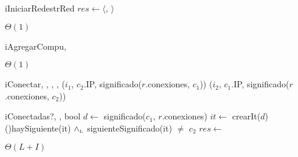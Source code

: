 \begin{Algoritmos}

  \nuevoAlgo
  \begin{algoritmo}{iIniciarRed}{}{estrRed}
    $res \gets \langle$\vacio{}, \vacio{}$\rangle$ 
  \end{algoritmo}
  \datosAlgoritmo{} %
  {} %
  {} %
  {$\Theta(1)$} %
  {} %

  \nuevoAlgo
  \begin{algoritmo}{iAgregarCompu}{, }{}
     
     
  \end{algoritmo}
  \datosAlgoritmo{} %
  {} %
  {} %
  {$\Theta(1)$} %
  {} %

  
  
  \nuevoAlgo
  \begin{algoritmo}{iConectar}{, , , , }{}
    ($i_{1}$, $c_{2}$.IP, significado($r$.conexiones, $c_{1}$))
    ($i_{2}$, $c_{1}$.IP, significado($r$.conexiones, $c_{2}$))
  \end{algoritmo}
  \datosAlgoritmo{} %
  {} %
  {} %
  {} %
  {} %
  
  \nuevoAlgo
  \begin{algoritmo}{iConectadas?}{, , }{bool}{}
     $d \gets$ significado($c_1$, $r$.conexiones) 
     $it \gets$ crearIt($d$) 
    \While(){haySiguiente(it) $\land_{\mathrm{\scriptscriptstyle{L}}}$ siguienteSignificado(it) $\neq$ $c_2$}{
       
    }
    $res \gets$  
  \end{algoritmo}  
  \datosAlgoritmo{} %
  {} %
  {} %
  {$\Theta(L+I)$} %
  {} %


\end{Algoritmos}
